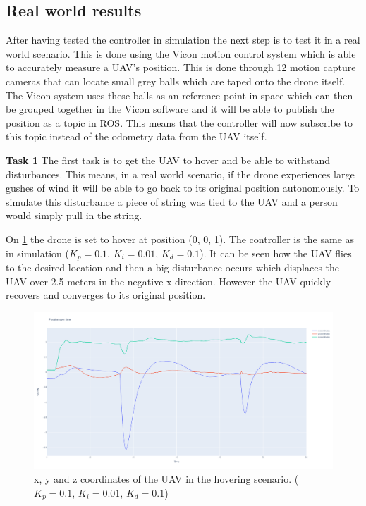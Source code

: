 \documentclass[conference]{IEEEtran}
\begin{document}
\subsection{Real world results}
After having tested the controller in simulation the next step is to test it in a real world scenario. This is done using the Vicon motion control system which is able to accurately measure a UAV's position. This is done through 12 motion capture cameras that can locate small grey balls which are taped onto the drone itself. The Vicon system uses these balls as an reference point in space which can then be grouped together in the Vicon software and it will be able to publish the position as a topic in ROS. This means that the controller will now subscribe to this topic instead of the odometry data from the UAV itself.

\textbf{Task 1}
The first task is to get the UAV to hover and be able to withstand disturbances. This means, in a real world scenario, if the drone experiences large gushes of wind it will be able to go back to its original position autonomously. To simulate this disturbance a piece of string was tied to the UAV and a person would simply pull in the string.

On \cref{fig:task1_10_pos} the drone is set to hover at position (0, 0, 1). The controller is the same as in simulation ($K_p = 0.1$, $K_i = 0.01$, $K_d = 0.1$). It can be seen how the UAV flies to the desired location and then a big disturbance occurs which displaces the UAV over 2.5 meters in the negative x-direction. However the UAV quickly recovers and converges to its original position.  

\begin{figure}[hbtp]
	\centering
	\includegraphics[width=1.0\linewidth]{images/task1_10_pos.png}
	\caption{x, y and z coordinates of the UAV in the hovering scenario. ($K_p = 0.1$, $K_i = 0.01$, $K_d = 0.1$)}
	\label{fig:task1_10_pos}
\end{figure}
\end{document}
